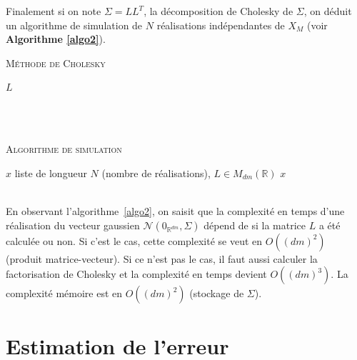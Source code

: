 Finalement si on note $\Sigma = LL^{T}$, la décomposition de Cholesky de $\Sigma$, on déduit un algorithme de simulation
de $N$ réalisations indépendantes de $X_M$ (voir \textbf{Algorithme \ref{algo2}}).
~\\

\begin{algorithm}
\caption{\textsc{Méthode de Cholesky}}
\label{algo1}
\begin{algorithmic}
\BEGIN 
{}
\ENDFOR
\ENDFOR
\END
\ENSURE $L$ \\
\end{algorithmic}
\end{algorithm}

~\\
~\\



\begin{algorithm}
\caption{\textsc{Algorithme de simulation}}
\label{algo2}
\begin{algorithmic}
\REQUIRE $x$ liste de longueur $N$ (nombre de réalisations), $L \in M_{dm}(\mathbb{R})$ 
\BEGIN 
{}  
\ENDFOR
\END
\ENSURE $x$ \\
\end{algorithmic}
\end{algorithm}
~\\
En observant l'algorithme~\ref{algo2}, on saisit que la complexité en temps d'une réalisation du vecteur gaussien $\mathcal{N}(0_{\mathbb{R}^{dm}},\Sigma)$ dépend de
si la matrice $L$ a été calculée ou non. Si c'est le cas, cette complexité se veut en $O((dm)^2)$ (produit matrice-vecteur). Si ce n'est pas
le cas, il faut aussi calculer la factorisation de Cholesky et la complexité en temps devient $O((dm)^3)$. La complexité
mémoire est en $O((dm)^2)$ (stockage de $\Sigma$).
\newpage
\section{Estimation de l'erreur}


